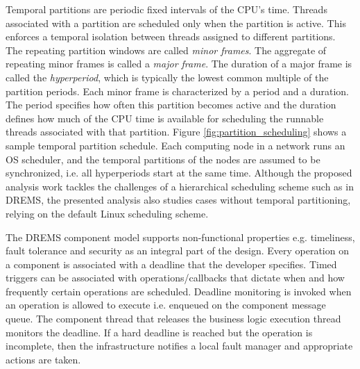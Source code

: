 Temporal partitions are periodic fixed intervals of the CPU's time. Threads associated with a partition are scheduled only when the partition is active. This enforces a temporal isolation between threads assigned to different partitions. The repeating partition windows are called \emph{minor frames}. The aggregate of repeating minor frames is called a \emph{major frame}. The duration of a major frame is called the \emph{hyperperiod}, which is typically the lowest common multiple of the partition periods. Each minor frame is characterized by a period and a duration. The period specifies how often this partition becomes active and the duration defines how much of the CPU time is available for scheduling the runnable threads associated with that partition. Figure \ref{fig:partition_scheduling} shows a sample temporal partition schedule. Each computing node in a network runs an OS scheduler, and the temporal partitions of the nodes are assumed to be synchronized, i.e. all hyperperiods start at the same time. Although the proposed analysis work tackles the challenges of a hierarchical scheduling scheme such as in DREMS, the presented analysis also studies cases without temporal partitioning, relying on the default Linux scheduling scheme.

The DREMS component model supports non-functional properties e.g. timeliness, fault tolerance and security as an integral part of the design. Every operation on a component is associated with a deadline that the developer specifies. Timed triggers can be associated with operations/callbacks that dictate when and how frequently certain operations are scheduled. Deadline monitoring is invoked when an operation is allowed to execute i.e. enqueued on the component message queue. The component thread that releases the business logic execution thread monitors the deadline. If a hard deadline is reached but the operation is incomplete, then the infrastructure notifies a local fault manager and appropriate actions are taken. 

